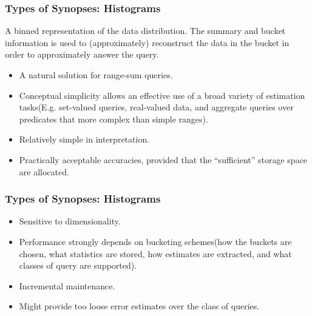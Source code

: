 \documentclass{beamer}
\begin{document}
\begin{frame}
\frametitle{Types of Synopses: Histograms}
A binned representation of the data distribution. The summary and bucket information is
used to (approximately) reconstruct the data in the bucket in order
to approximately answer the query.\pause
\vspace{0.2 cm}
\begin{itemize}
\item{A natural solution for range-sum queries.}
\item{Conceptual simplicity allows an effective use of a broad variety of estimation tasks(E.g. set-valued queries, real-valued data, and aggregate queries over predicates that more complex than simple ranges).}
\item{Relatively simple in interpretation.}
\item{Practically acceptable accuracies, provided that the “sufficient” storage space are allocated.}
\end{itemize}
\end{frame}

\begin{frame}
\frametitle{Types of Synopses: Histograms}
\begin{itemize}
\item{Sensitive to dimensionality.}
\item{Performance strongly depends on bucketing schemes(how the buckets are chosen, what statistics are stored, how estimates are extracted, and what classes of query are supported).}
\item{Incremental maintenance.}
\item{Might provide too loose error estimates over the class of queries.}
\end{itemize}
\end{frame}
\end{document}
